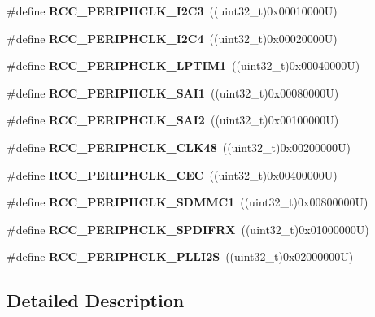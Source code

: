 \begin{DoxyCompactItemize}
\#define {\bfseries R\+C\+C\+\_\+\+P\+E\+R\+I\+P\+H\+C\+L\+K\+\_\+\+I2\+C3}~((uint32\+\_\+t)0x00010000\+U)
\item 
\mbox{\label{group___r_c_c_ex___periph___clock___selection_ga43446cae0c5716620fd3bb0ab129715b}} 
\#define {\bfseries R\+C\+C\+\_\+\+P\+E\+R\+I\+P\+H\+C\+L\+K\+\_\+\+I2\+C4}~((uint32\+\_\+t)0x00020000\+U)
\item 
\mbox{\label{group___r_c_c_ex___periph___clock___selection_ga56ca7e8b3726ee68934795277eb0cbce}} 
\#define {\bfseries R\+C\+C\+\_\+\+P\+E\+R\+I\+P\+H\+C\+L\+K\+\_\+\+L\+P\+T\+I\+M1}~((uint32\+\_\+t)0x00040000\+U)
\item 
\mbox{\label{group___r_c_c_ex___periph___clock___selection_ga9b5a57e48c326c3b477b8361f6f246b8}} 
\#define {\bfseries R\+C\+C\+\_\+\+P\+E\+R\+I\+P\+H\+C\+L\+K\+\_\+\+S\+A\+I1}~((uint32\+\_\+t)0x00080000\+U)
\item 
\mbox{\label{group___r_c_c_ex___periph___clock___selection_ga7030f1b97abf4c891da0506fbd5df96b}} 
\#define {\bfseries R\+C\+C\+\_\+\+P\+E\+R\+I\+P\+H\+C\+L\+K\+\_\+\+S\+A\+I2}~((uint32\+\_\+t)0x00100000\+U)
\item 
\mbox{\label{group___r_c_c_ex___periph___clock___selection_gab023056d0d10d8d3bd1013a88e0bebce}} 
\#define {\bfseries R\+C\+C\+\_\+\+P\+E\+R\+I\+P\+H\+C\+L\+K\+\_\+\+C\+L\+K48}~((uint32\+\_\+t)0x00200000\+U)
\item 
\mbox{\label{group___r_c_c_ex___periph___clock___selection_gae7b08ed2b8df3517d5de1013e2f4ac8e}} 
\#define {\bfseries R\+C\+C\+\_\+\+P\+E\+R\+I\+P\+H\+C\+L\+K\+\_\+\+C\+EC}~((uint32\+\_\+t)0x00400000\+U)
\item 
\mbox{\label{group___r_c_c_ex___periph___clock___selection_ga8fc99091c35bb2c4d6de5f59647deced}} 
\#define {\bfseries R\+C\+C\+\_\+\+P\+E\+R\+I\+P\+H\+C\+L\+K\+\_\+\+S\+D\+M\+M\+C1}~((uint32\+\_\+t)0x00800000\+U)
\item 
\mbox{\label{group___r_c_c_ex___periph___clock___selection_gae696b64cfe8a0c2ba96030c427fa77d5}} 
\#define {\bfseries R\+C\+C\+\_\+\+P\+E\+R\+I\+P\+H\+C\+L\+K\+\_\+\+S\+P\+D\+I\+F\+RX}~((uint32\+\_\+t)0x01000000\+U)
\item 
\mbox{\label{group___r_c_c_ex___periph___clock___selection_ga31b35acf124831881c39c31f4bed5de2}} 
\#define {\bfseries R\+C\+C\+\_\+\+P\+E\+R\+I\+P\+H\+C\+L\+K\+\_\+\+P\+L\+L\+I2S}~((uint32\+\_\+t)0x02000000\+U)
\end{DoxyCompactItemize}


\subsection{Detailed Description}
